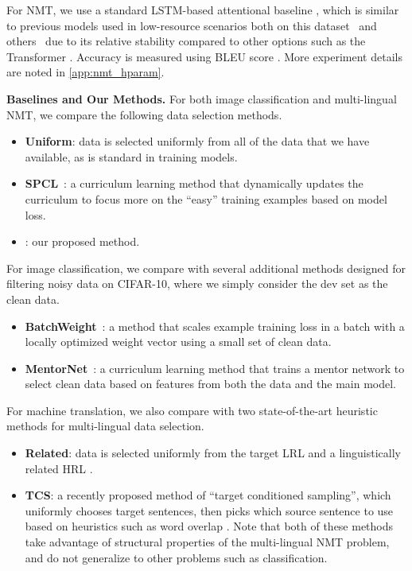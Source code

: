 For NMT, we use a standard LSTM-based attentional baseline \citep{attention}, which is similar to previous models used in low-resource scenarios both on this dataset~\citep{rapid_adapt_nmt,sde} and others~\citep{lownmt19} due to its relative stability compared to other options such as the Transformer \citep{vaswani2017attention}. Accuracy is measured using BLEU score \citep{bleu}.
More experiment details are noted in \autoref{app:nmt_hparam}.

\noindent \textbf{Baselines and Our Methods.}
For both image classification and multi-lingual NMT, we compare the following data selection methods.
\begin{itemize}
\item \textbf{Uniform}: data is selected uniformly from all of the data that we have available, as is standard in training models. 
\item \textbf{SPCL}~\citep{spcl}: a curriculum learning method that dynamically updates the curriculum to focus more on the ``easy'' training examples based on model loss.
\item \textbf{\dds}: our proposed method.
\end{itemize}

For image classification, we compare with several additional methods designed for filtering noisy data on CIFAR-10, where we simply consider the dev set as the clean data.
\begin{itemize}
\item \textbf{BatchWeight}~\citep{learn_reweight}: a method that scales example training loss in a batch with a locally optimized weight vector using a small set of clean data. 
\item  \textbf{MentorNet}~\citep{mentornet}: a curriculum learning method that trains a mentor network to select clean data based on features from both the data and the main model. 
\end{itemize}


For machine translation, we also compare with two state-of-the-art heuristic methods for multi-lingual data selection.
\begin{itemize}
\item \textbf{Related}: data is selected uniformly from the target LRL and a linguistically related HRL \citep{rapid_adapt_nmt}. 
\item  \textbf{TCS}: a recently proposed method of ``target conditioned sampling'', which uniformly chooses target sentences, then picks which source sentence to use based on heuristics such as word overlap \citep{TCS}.
Note that both of these methods take advantage of structural properties of the multi-lingual NMT problem, and do not generalize to other problems such as classification.
\end{itemize}

